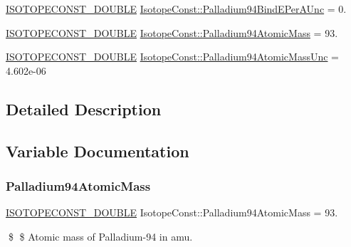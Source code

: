 \begin{DoxyCompactItemize}
\mbox{\hyperlink{group___isotope_const-_macros_ga8f45a7272ce02c0b4c65c44636ed719a}{I\+S\+O\+T\+O\+P\+E\+C\+O\+N\+S\+T\+\_\+\+D\+O\+U\+B\+LE}} \mbox{\hyperlink{group___isotope_const-_palladium-_pd94_gabc5d14b15f0208a0a39b57c4b055933b}{Isotope\+Const\+::\+Palladium94\+Bind\+E\+Per\+A\+Unc}} = 0.
\item 
\mbox{\hyperlink{group___isotope_const-_macros_ga8f45a7272ce02c0b4c65c44636ed719a}{I\+S\+O\+T\+O\+P\+E\+C\+O\+N\+S\+T\+\_\+\+D\+O\+U\+B\+LE}} \mbox{\hyperlink{group___isotope_const-_palladium-_pd94_ga3890b879afdb34a479f870e07d5378ac}{Isotope\+Const\+::\+Palladium94\+Atomic\+Mass}} = 93.
\item 
\mbox{\hyperlink{group___isotope_const-_macros_ga8f45a7272ce02c0b4c65c44636ed719a}{I\+S\+O\+T\+O\+P\+E\+C\+O\+N\+S\+T\+\_\+\+D\+O\+U\+B\+LE}} \mbox{\hyperlink{group___isotope_const-_palladium-_pd94_gabbc68ae93d0d175d76eeb20dd78e757c}{Isotope\+Const\+::\+Palladium94\+Atomic\+Mass\+Unc}} = 4.\+602e-\/06
\end{DoxyCompactItemize}


\subsection{Detailed Description}


\subsection{Variable Documentation}
\mbox{\label{group___isotope_const-_palladium-_pd94_ga3890b879afdb34a479f870e07d5378ac}} 
\subsubsection{\texorpdfstring{Palladium94\+Atomic\+Mass}{Palladium94AtomicMass}}
{\footnotesize\ttfamily \mbox{\hyperlink{group___isotope_const-_macros_ga8f45a7272ce02c0b4c65c44636ed719a}{I\+S\+O\+T\+O\+P\+E\+C\+O\+N\+S\+T\+\_\+\+D\+O\+U\+B\+LE}} Isotope\+Const\+::\+Palladium94\+Atomic\+Mass = 93.}

\$ \$ Atomic mass of Palladium-\/94 in amu. \mbox{\label{group___isotope_const-_palladium-_pd94_gabbc68ae93d0d175d76eeb20dd78e757c}} 
